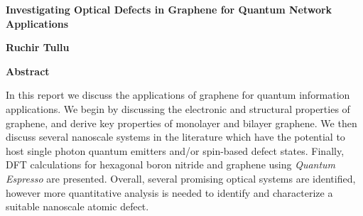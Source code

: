 \thispagestyle{plain}
\begin{center}
    \Large
    \textbf{Investigating Optical Defects in Graphene for Quantum Network Applications}
    
    
    \vspace{0.4cm}
    \large
    \textbf{Ruchir Tullu}
    
    \vspace{0.9cm}
    \textbf{Abstract}
\end{center}

In this report we discuss the applications of graphene for quantum information applications. We begin by discussing the electronic and structural properties of graphene, and derive key properties of monolayer and bilayer graphene. We then discuss several nanoscale systems in the literature which have the potential to host single photon quantum emitters and/or spin-based defect states. Finally, DFT calculations for hexagonal boron nitride and graphene using \textit{Quantum Espresso} are presented. Overall, several promising optical systems are identified, however more quantitative analysis is needed to identify and characterize a suitable nanoscale atomic defect. 
